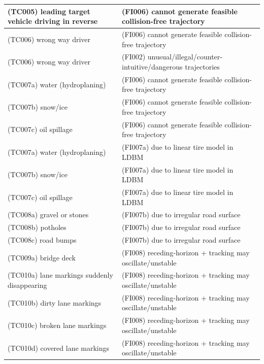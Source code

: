 \documentclass{article}
\begin{document}
\begin{longtable}{|p{8cm}|p{8cm}|}
\cellcolor{cGreen}(TC005) leading target vehicle driving in reverse& \cellcolor{cBlue}(FI006) cannot generate feasible collision-free trajectory\\\hline
\cellcolor{cGreen}(TC006) wrong way driver& \cellcolor{cBlue}(FI006) cannot generate feasible collision-free trajectory\\\hline
\cellcolor{cGreen}(TC006) wrong way driver& \cellcolor{cBlue}(FI002) unusual/illegal/counter-intuitive/dangerous trajectories\\\hline
\cellcolor{cRed}(TC007a) water (hydroplaning)& \cellcolor{cBlue}(FI006) cannot generate feasible collision-free trajectory\\\hline
\cellcolor{cRed}(TC007b) snow/ice& \cellcolor{cBlue}(FI006) cannot generate feasible collision-free trajectory\\\hline
\cellcolor{cRed}(TC007c) oil spillage& \cellcolor{cBlue}(FI006) cannot generate feasible collision-free trajectory\\\hline
\cellcolor{cRed}(TC007a) water (hydroplaning)& \cellcolor{cBlue}(FI007a) due to linear tire model in LDBM\\\hline
\cellcolor{cRed}(TC007b) snow/ice& \cellcolor{cBlue}(FI007a) due to linear tire model in LDBM\\\hline
\cellcolor{cRed}(TC007c) oil spillage& \cellcolor{cBlue}(FI007a) due to linear tire model in LDBM\\\hline
\cellcolor{cRed}(TC008a) gravel or stones& \cellcolor{cBlue}(FI007b) due to irregular road surface\\\hline
\cellcolor{cRed}(TC008b) potholes& \cellcolor{cBlue}(FI007b) due to irregular road surface\\\hline
\cellcolor{cRed}(TC008c) road bumps& \cellcolor{cBlue}(FI007b) due to irregular road surface\\\hline
\cellcolor{cRed}(TC009a) bridge deck& \cellcolor{cBlue}(FI008) receding-horizon + tracking may oscillate/unstable\\\hline
\cellcolor{cYellow}(TC010a) lane markings suddenly disappearing& \cellcolor{cBlue}(FI008) receding-horizon + tracking may oscillate/unstable\\\hline
\cellcolor{cYellow}(TC010b) dirty lane markings& \cellcolor{cBlue}(FI008) receding-horizon + tracking may oscillate/unstable\\\hline
\cellcolor{cYellow}(TC010c) broken lane markings& \cellcolor{cBlue}(FI008) receding-horizon + tracking may oscillate/unstable\\\hline
\cellcolor{cYellow}(TC010d) covered lane markings& \cellcolor{cBlue}(FI008) receding-horizon + tracking may oscillate/unstable\\\hline

\end{longtable}
\end{document}

